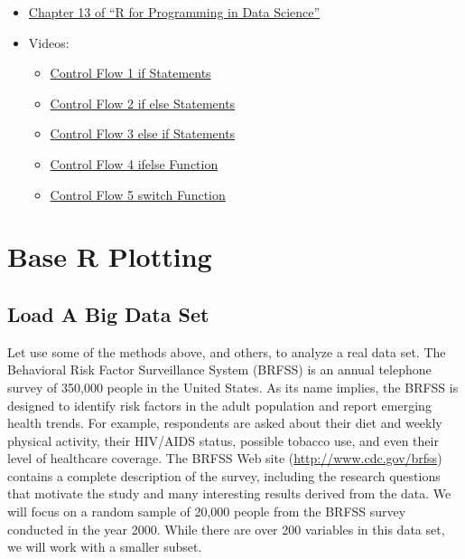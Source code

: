 \documentclass[
]{book}
\providecommand{\tightlist}{%
  \setlength{\itemsep}{0pt}\setlength{\parskip}{0pt}}
\begin{document}
\begin{itemize}
\tightlist
\item
  \href{https://bookdown.org/rdpeng/rprogdatascience/functions.html\#the-...-argument}{Chapter 13 of ``R for Programming in Data Science''}
\item
  Videos:

  \begin{itemize}
  \tightlist
  \item
    \href{https://ucr.yuja.com/V/Video?v=2369005\&node=8488277\&a=1089164180\&autoplay=1}{Control Flow 1 \textbar{} if Statements}
  \item
    \href{https://ucr.yuja.com/V/Video?v=2369004\&node=8488276\&a=68950775\&autoplay=1}{Control Flow 2 \textbar{} if else Statements}
  \item
    \href{https://ucr.yuja.com/V/Video?v=2369003\&node=8488275\&a=577245814\&autoplay=1}{Control Flow 3 \textbar{} else if Statements}
  \item
    \href{https://ucr.yuja.com/V/Video?v=2369002\&node=8488274\&a=2043700498\&autoplay=1}{Control Flow 4 \textbar{} ifelse Function}
  \item
    \href{https://ucr.yuja.com/V/Video?v=2369001\&node=8488273\&a=523725749\&autoplay=1}{Control Flow 5 \textbar{} switch Function}
  \end{itemize}
\end{itemize}

\hypertarget{base-r-plotting}{%
\chapter{Base R Plotting}\label{base-r-plotting}}

\hypertarget{load-a-big-data-set}{%
\section{Load A Big Data Set}\label{load-a-big-data-set}}

Let use some of the methods above, and others, to analyze a real data set. The Behavioral Risk Factor Surveillance System (BRFSS) is an annual telephone survey of 350,000 people in the United States. As its name implies, the BRFSS is designed to identify risk factors in the adult population and report emerging health trends. For example, respondents are asked about their diet and weekly physical activity, their HIV/AIDS status, possible tobacco use, and even their level of healthcare coverage. The BRFSS Web site (\url{http://www.cdc.gov/brfss}) contains a complete description of the survey, including the research questions that motivate the study and many interesting results derived from the data. We will focus on a random sample of 20,000 people from the BRFSS survey conducted in the year 2000. While there are over 200 variables in this data set, we will work with a smaller subset.
\end{document}
